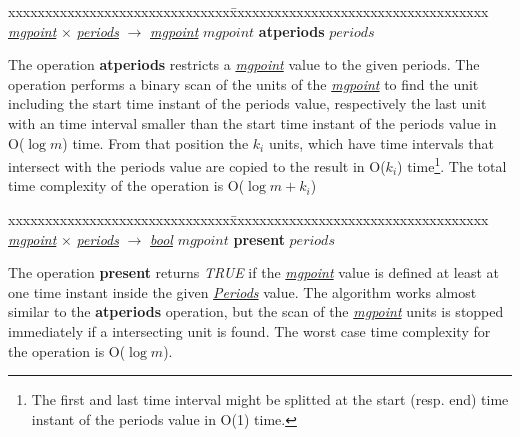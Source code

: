 \documentclass[a4paper]{article}
\newcommand{\op}[1]{\textbf{#1}}
\newcommand{\dt}[1]{\textsl{\underline{#1}}}
\newcommand{\true}{\textsl{TRUE}}
\begin{document}
\begin{tabbing}
xxxxxxxxxxxxxxxxxxxxxxxxxxxxxx\=xxxxxxxxxxxxxxxxxxxxxxxxxxxxxxxxxxx\kill
\dt{mgpoint} $\times$ \dt{periods} $\rightarrow$ \dt{mgpoint} \> $mgpoint$
\op{atperiods} $periods$\\
\end{tabbing}
The operation \op{atperiods} restricts a \dt{mgpoint} value to the given
periods. The operation performs a binary scan of the units of the \dt{mgpoint}
to find the unit including the start time instant of the periods value,
respectively the last unit with an time interval smaller than the start time
instant of the periods value in O($\log m$) time. From that position the $k_i$
units, which have time intervals that intersect with the periods value are
copied to the result in O($k_i$) time\footnote{The first and last time
interval might be splitted at the start (resp. end) time instant of the periods
value in O(1) time.}. The total time complexity of the operation is O($\log {m}
+ k_i$)
\begin{tabbing}
xxxxxxxxxxxxxxxxxxxxxxxxxxxxxx\=xxxxxxxxxxxxxxxxxxxxxxxxxxxxxxxxxxx\kill
\dt{mgpoint} $\times$ \dt{periods} $\rightarrow$ \dt{bool} \> $mgpoint$
\op{present} $periods$\\
\end{tabbing}
The operation \op{present} returns \true{} if the \dt{mgpoint} value is
defined at least at one time instant inside the given \dt{Periods} value. The
algorithm works almost similar to the \op{atperiods} operation, but
the scan of the \dt{mgpoint} units is stopped immediately if a intersecting unit
is found. The worst case time complexity for the operation is O($\log {m}$).
\end{document}
